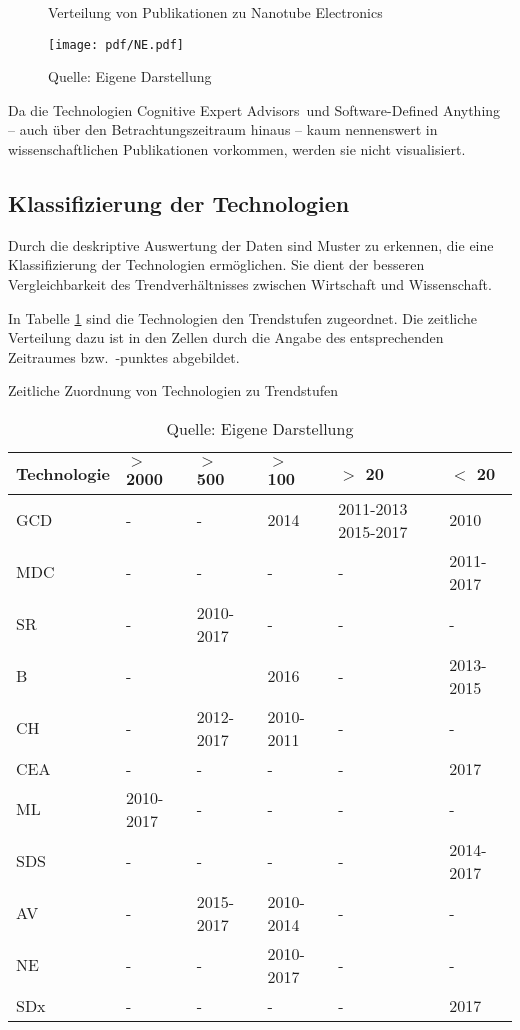 \begin{figure}
	\centering
	\caption{Verteilung von Publikationen zu \glqq Nanotube Electronics\grqq}
	\texttt{[image: pdf/NE.pdf]}
	\caption*{Quelle: Eigene Darstellung}
	\label{fig:ne_pub}
\end{figure}

Da die Technologien \glqq Cognitive Expert Advisors\grqq~und \glqq Software-Defined Anything\grqq~ -- auch über den Betrachtungszeitraum hinaus -- kaum nennenswert in wissenschaftlichen Publikationen vorkommen, werden sie nicht visualisiert.

\subsection{Klassifizierung der Technologien}
Durch die deskriptive Auswertung der Daten sind Muster zu erkennen, die eine Klassifizierung der Technologien ermöglichen. Sie dient der besseren Vergleichbarkeit des Trendverhältnisses zwischen Wirtschaft und Wissenschaft.

In Tabelle \ref{tab:class_trend_ev} sind die Technologien den Trendstufen zugeordnet. Die zeitliche Verteilung dazu ist in den Zellen durch die Angabe des entsprechenden Zeitraumes bzw.~-punktes abgebildet.

\begin{table}
	\caption{Zeitliche Zuordnung von Technologien zu Trendstufen}
	\selectfont
	\footnotesize
	\centering
	\label{tab:class_trend_ev}
	\begin{tabularx}{\linewidth}{p{2.2cm}|XXXXX}
		Technologie & $>$ 2000 & $>$ 500 & $>$ 100 & $>$ 20 & $<$ 20 \\
		\hline
		\acs{GCD} & - & - & 2014 & 2011-2013 2015-2017 & 2010 \\
		\acs{MDC} & - & - & - & - & 2011-2017 \\
		\acs{SR} & - & 2010-2017 & - & - & - \\
		\acs{B} & - & & 2016 & - & 2013-2015 \\
		\acs{CH} & - & 2012-2017 & 2010-2011 & - & - \\
		\acs{CEA} & - & - & - & - & 2017 \\
		\acs{ML} & 2010-2017 & - & - & - & - \\
		\acs{SDS} & - & - & - & - & 2014-2017 \\
		\acs{AV} & - & 2015-2017 & 2010-2014 & - & - \\
		\acs{NE} & - & - & 2010-2017 & - & - \\
		\acs{SDx} & - & - & - & - & 2017 \\
	\end{tabularx}
	\caption*{Quelle: Eigene Darstellung}
\end{table}

